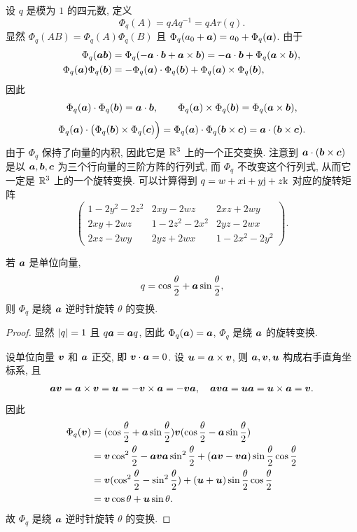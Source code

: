 设 $q$ 是模为 $1$ 的四元数, 定义
\begin{equation}
  \label{eq:rotation-quaternion}
  \Phi_q(A)=qAq^{-1}=qA\tau(q).
\end{equation}
显然 $\Phi_q(AB)=\Phi_q(A)\Phi_q(B)$ 且 $\Phi_q(a_0+\bfa)=a_0+\Phi_q(\bfa)$.
由于
\begin{align*}
   \Phi_q(\bfa\bfb)&
   =\Phi_q(-\bfa\cdot\bfb+\bfa\times\bfb)
   =-\bfa\cdot\bfb+\Phi_q(\bfa\times\bfb),\\
   \Phi_q(\bfa)\Phi_q(\bfb)&
  =-\Phi_q(\bfa)\cdot\Phi_q(\bfb)
    +\Phi_q(\bfa)\times\Phi_q(\bfb),
\end{align*}
因此
\[
   \Phi_q(\bfa)\cdot\Phi_q(\bfb)
  =\bfa\cdot\bfb,\qquad
   \Phi_q(\bfa)\times\Phi_q(\bfb)
  =\Phi_q(\bfa\times\bfb),
\]
\[
  \Phi_q(\bfa)\cdot\bigl(\Phi_q(\bfb)\times\Phi_q(\bfc)\Bigr)
  =\Phi_q(\bfa)\cdot\Phi_q(\bfb\times\bfc)
  =\bfa\cdot(\bfb\times\bfc).
\]
由于 $\Phi_q$ 保持了向量的内积, 因此它是 $\BR^3$ 上的一个正交变换.
注意到 $\bfa\cdot(\bfb\times\bfc)$ 是以 $\bfa,\bfb,\bfc$ 为三个行向量的三阶方阵的行列式, 而 $\Phi_q$ 不改变这个行列式, 从而它一定是 $\BR^3$ 上的一个旋转变换.
可以计算得到 $q=w+x\ii+y\jj+z\kk$ 对应的旋转矩阵
\[
 \begin{pmatrix}
   1-2y^2-2z^2&2xy-2wz&2xz+2wy\\
   2xy+2wz&1-2z^2-2x^2&2yz-2wx\\
   2xz-2wy&2yz+2wx&1-2x^2-2y^2
 \end{pmatrix}.
\]

\begin{theorem}
  若 $\bfa$ 是单位向量,
  \[
    q=\cos\frac\theta2+\bfa\sin\frac\theta2,
  \]
  则 $\Phi_q$ 是绕 $\bfa$ 逆时针旋转 $\theta$ 的变换.
\end{theorem}

\begin{proof}
  显然 $\abs{q}=1$ 且 $q\bfa=\bfa q$, 因此 $\Phi_q(\bfa)=\bfa$, $\Phi_q$ 是绕 $\bfa$ 的旋转变换.

  设单位向量 $\bfv$ 和 $\bfa$ 正交, 即 $\bfv\cdot \bfa=0$.
  设 $\bfu=\bfa\times\bfv$, 则 $\bfa,\bfv,\bfu$ 构成右手直角坐标系, 且
  \[
    \bfa\bfv=\bfa\times\bfv=\bfu=-\bfv\times\bfa=-\bfv\bfa,\quad
    \bfa\bfv\bfa=\bfu\bfa=\bfu\times\bfa=\bfv.
  \]
  因此
  \begin{align*}
    \Phi_q(\bfv)&
    =(\cos\frac\theta2+\bfa\sin\frac\theta2)\bfv 
      (\cos\frac\theta2-\bfa\sin\frac\theta2)\\&
    =\bfv\cos^2\frac\theta2-\bfa\bfv\bfa\sin^2\frac\theta2
      +(\bfa\bfv-\bfv\bfa)\sin\frac\theta2\cos\frac\theta2\\&
    =\bfv(\cos^2\frac\theta2-\sin^2\frac\theta2)
      +(\bfu+\bfu)\sin\frac\theta2\cos\frac\theta2\\&
    =\bfv\cos\theta+\bfu\sin\theta.
  \end{align*}
  故 $\Phi_q$ 是绕 $\bfa$ 逆时针旋转 $\theta$ 的变换.
\end{proof}

